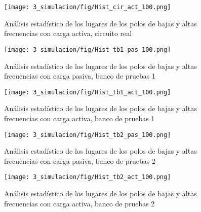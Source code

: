 \begin{figure}
    \centering
    \texttt{[image: 3\_simulacion/fig/Hist\_cir\_act\_100.png]}
    \caption{Análisis estadístico de los lugares de los polos de bajas y altas frecuencias con carga activa, circuito real}
\end{figure}

\begin{figure}
    \centering
    \texttt{[image: 3\_simulacion/fig/Hist\_tb1\_pas\_100.png]}
    \caption{Análisis estadístico de los lugares de los polos de bajas y altas frecuencias con carga pasiva, banco de pruebas 1}
\end{figure}

\begin{figure}
    \centering
    \texttt{[image: 3\_simulacion/fig/Hist\_tb1\_act\_100.png]}
    \caption{Análisis estadístico de los lugares de los polos de bajas y altas frecuencias con carga activa, banco de pruebas 1}
\end{figure}

\begin{figure}
    \centering
    \texttt{[image: 3\_simulacion/fig/Hist\_tb2\_pas\_100.png]}
    \caption{Análisis estadístico de los lugares de los polos de bajas y altas frecuencias con carga pasiva, banco de pruebas 2}
\end{figure}

\begin{figure}
    \centering
    \texttt{[image: 3\_simulacion/fig/Hist\_tb2\_act\_100.png]}
    \caption{Análisis estadístico de los lugares de los polos de bajas y altas frecuencias con carga activa, banco de pruebas 2}
\end{figure}

